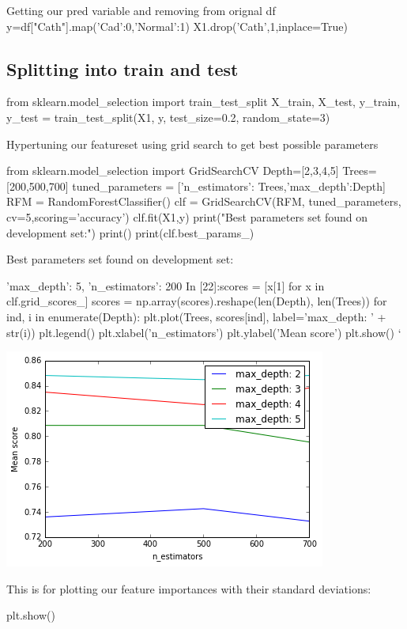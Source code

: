 \documentclass[sigconf]{acmart}
\begin{document}
Getting our pred variable and removing from orignal df
y=df["Cath"].map({'Cad':0,'Normal':1})
X1.drop('Cath',1,inplace=True)

\subsection{Splitting into train and test}

from sklearn.model_selection import train_test_split
X_train, X_test, y_train, y_test = train_test_split(X1, y, test_size=0.2, random_state=3)

Hypertuning our featureset using grid search to get best possible parameters

from sklearn.model_selection import GridSearchCV
Depth=[2,3,4,5]
Trees=[200,500,700]
tuned_parameters = [{'n_estimators': Trees,'max_depth':Depth}]              
RFM = RandomForestClassifier()
clf = GridSearchCV(RFM, tuned_parameters, cv=5,scoring='accuracy')
clf.fit(X1,y)
print("Best parameters set found on development set:")
print()
print(clf.best_params_)


Best parameters set found on development set:

{'max_depth': 5, 'n_estimators': 200}
In [22]:scores = [x[1] for x in clf.grid_scores_]
scores = np.array(scores).reshape(len(Depth), len(Trees))
for ind, i in enumerate(Depth):
plt.plot(Trees, scores[ind], label='max_depth: ' + str(i))
plt.legend()
plt.xlabel('n_estimators')
plt.ylabel('Mean score')
plt.show()
`

\includegraphics[width=0.95\columnwidth]{images/output_15_1.png}

This is for plotting our feature importances with their standard deviations:

plt.show()
\end{document}
